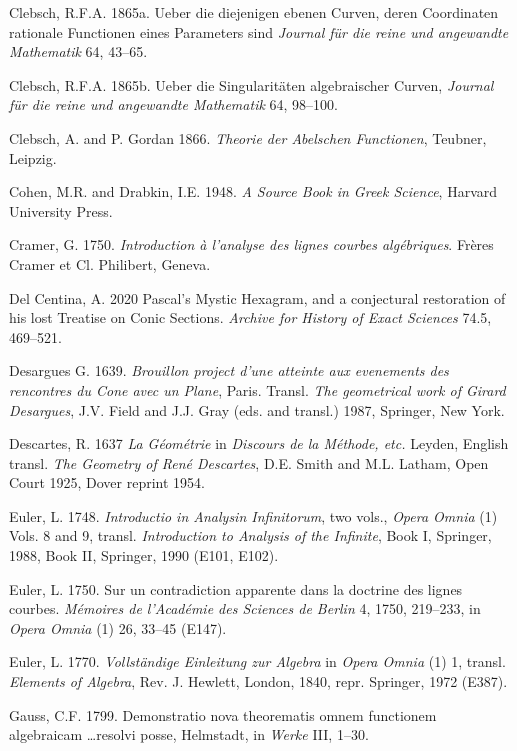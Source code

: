 \documentclass[11pt]{article}
\begin{document}
\noindent Clebsch, R.F.A. 1865a. Ueber die diejenigen ebenen Curven, deren Coordinaten rationale Functionen eines Parameters sind \emph{Journal f\"ur die reine und angewandte Mathematik} 64, 43--65.

\noindent Clebsch, R.F.A. 1865b. Ueber die Singularit\"aten algebraischer Curven, \emph{Journal f\"ur die reine und angewandte Mathematik} 64, 98--100.
 
\noindent Clebsch, A. and P. Gordan 1866. \emph{Theorie der Abelschen Functionen}, Teubner, Leipzig.

\noindent Cohen, M.R. and Drabkin, I.E. 1948. \emph{A Source Book in Greek Science}, Harvard University Press.

\noindent Cramer, G. 1750. \emph{Introduction \`a l'analyse des lignes courbes alg\'ebriques}. Fr\`eres Cramer et Cl. Philibert, Geneva.

\noindent Del Centina, A. 2020 Pascal's Mystic Hexagram, and a conjectural restoration of his lost Treatise on Conic Sections. \emph{Archive for History of Exact Sciences} 74.5, 469--521.
 
\noindent Desargues G. 1639. \emph{Brouillon project d'une atteinte aux evenements des rencontres du Cone avec un Plane}, Paris. Transl.  \emph{The geometrical work of Girard Desargues}, J.V. Field  and J.J. Gray (eds. and transl.) 1987, Springer, New York.

\noindent Descartes, R. 1637 \emph{La G\'eom\'etrie} in \emph{Discours de la M\'ethode, etc.} Leyden, English transl. \emph{The Geometry of Ren\'e Descartes}, D.E. Smith and M.L. Latham, Open Court 1925, Dover reprint 1954.
 
\noindent  Euler, L. 1748. \emph{Introductio in Analysin Infinitorum}, two vols., \emph{Opera Omnia} (1) Vols. 8 and 9, transl. \emph{Introduction to Analysis of the Infinite}, Book I,  Springer, 1988, Book II, Springer, 1990 (E101, E102).
 
\noindent  Euler, L. 1750.  Sur un contradiction apparente dans la doctrine des lignes courbes. \emph{M\'emoires de l'Acad\'emie des Sciences de Berlin} 4, 1750, 219--233, in  \emph{Opera Omnia} (1)   26, 33--45 (E147).

\noindent Euler, L. 1770. \emph{Vollst\"andige Einleitung zur Algebra} in \emph{Opera Omnia} (1) 1,  transl. \emph{Elements of Algebra}, Rev. J. Hewlett, London, 1840, repr.  Springer, 1972 (E387).

\noindent Gauss, C.F.  1799. Demonstratio nova theorematis omnem functionem algebraicam \ldots resolvi posse, Helmstadt, in \emph{Werke} III, 1--30.
\end{document}
